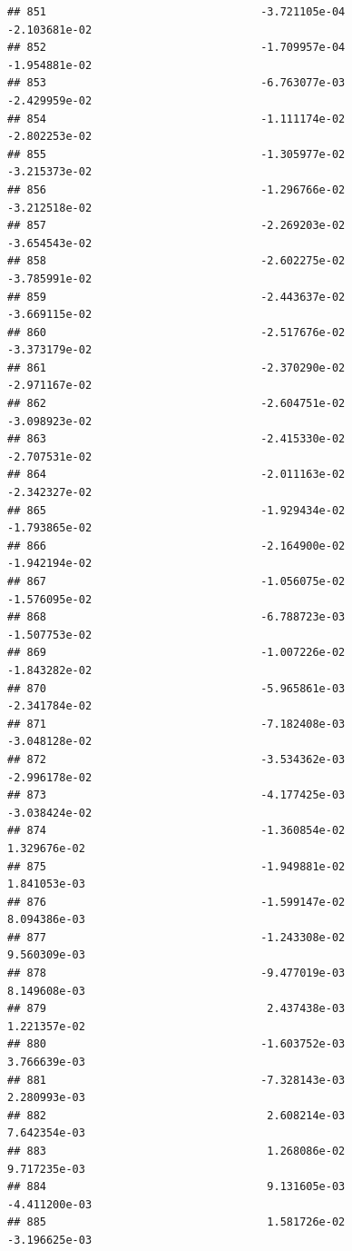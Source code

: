 \documentclass[
]{article}
\begin{document}
\begin{verbatim}
## 851                                 -3.721105e-04          -2.103681e-02
## 852                                 -1.709957e-04          -1.954881e-02
## 853                                 -6.763077e-03          -2.429959e-02
## 854                                 -1.111174e-02          -2.802253e-02
## 855                                 -1.305977e-02          -3.215373e-02
## 856                                 -1.296766e-02          -3.212518e-02
## 857                                 -2.269203e-02          -3.654543e-02
## 858                                 -2.602275e-02          -3.785991e-02
## 859                                 -2.443637e-02          -3.669115e-02
## 860                                 -2.517676e-02          -3.373179e-02
## 861                                 -2.370290e-02          -2.971167e-02
## 862                                 -2.604751e-02          -3.098923e-02
## 863                                 -2.415330e-02          -2.707531e-02
## 864                                 -2.011163e-02          -2.342327e-02
## 865                                 -1.929434e-02          -1.793865e-02
## 866                                 -2.164900e-02          -1.942194e-02
## 867                                 -1.056075e-02          -1.576095e-02
## 868                                 -6.788723e-03          -1.507753e-02
## 869                                 -1.007226e-02          -1.843282e-02
## 870                                 -5.965861e-03          -2.341784e-02
## 871                                 -7.182408e-03          -3.048128e-02
## 872                                 -3.534362e-03          -2.996178e-02
## 873                                 -4.177425e-03          -3.038424e-02
## 874                                 -1.360854e-02           1.329676e-02
## 875                                 -1.949881e-02           1.841053e-03
## 876                                 -1.599147e-02           8.094386e-03
## 877                                 -1.243308e-02           9.560309e-03
## 878                                 -9.477019e-03           8.149608e-03
## 879                                  2.437438e-03           1.221357e-02
## 880                                 -1.603752e-03           3.766639e-03
## 881                                 -7.328143e-03           2.280993e-03
## 882                                  2.608214e-03           7.642354e-03
## 883                                  1.268086e-02           9.717235e-03
## 884                                  9.131605e-03          -4.411200e-03
## 885                                  1.581726e-02          -3.196625e-03

\end{verbatim}
\end{document}
